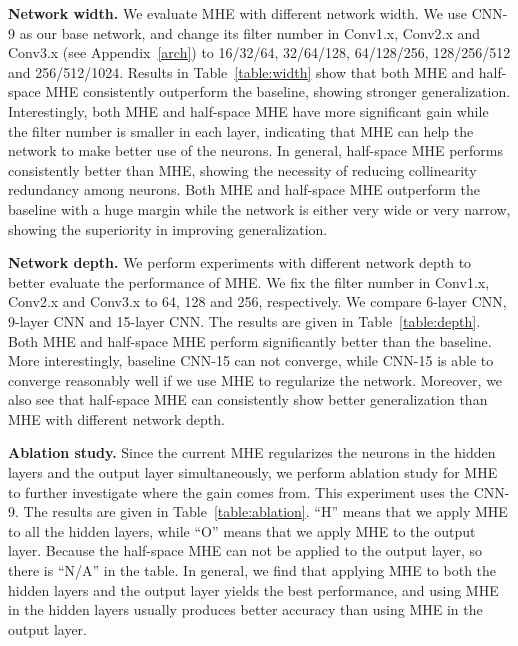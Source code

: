 \textbf{Network width.} We evaluate MHE with different network width. We use CNN-9 as our base network, and change its filter number in Conv1.x, Conv2.x and Conv3.x (see Appendix~\ref{arch}) to 16/32/64, 32/64/128, 64/128/256, 128/256/512 and 256/512/1024. Results in Table~\ref{table:width} show that both MHE and half-space MHE consistently outperform the baseline, showing stronger generalization. Interestingly, both MHE and half-space MHE have more significant gain while the filter number is smaller in each layer, indicating that MHE can help the network to make better use of the neurons. In general, half-space MHE performs consistently better than MHE, showing the necessity of reducing collinearity redundancy among neurons. Both MHE and half-space MHE outperform the baseline with a huge margin while the network is either very wide or very narrow, showing the superiority in improving generalization.
\par

\textbf{Network depth.} We perform experiments with different network depth to better evaluate the performance of MHE. We fix the filter number in Conv1.x, Conv2.x and Conv3.x to 64, 128 and 256, respectively. We compare 6-layer CNN, 9-layer CNN and 15-layer CNN. The results are given in Table~\ref{table:depth}. Both MHE and half-space MHE perform significantly better than the baseline. More interestingly, baseline CNN-15 can not converge, while CNN-15 is able to converge reasonably well if we use MHE to regularize the network. Moreover, we also see that half-space MHE can consistently show better generalization than MHE with different network depth.
\par

\textbf{Ablation study.} Since the current MHE regularizes the neurons in the hidden layers and the output layer simultaneously, we perform ablation study for MHE to further investigate where the gain comes from. This experiment uses the CNN-9. The results are given in Table~\ref{table:ablation}. ``H'' means that we apply MHE to all the hidden layers, while ``O'' means that we apply MHE to the output layer. Because the half-space MHE can not be applied to the output layer, so there is ``N/A'' in the table. In general, we find that applying MHE to both the hidden layers and the output layer yields the best performance, and using MHE in the hidden layers usually produces better accuracy than using MHE in the output layer.
\par
\par

